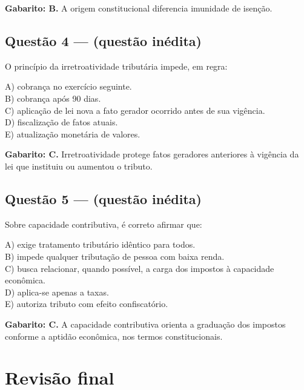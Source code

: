 \documentclass[11pt,a4paper]{article}
\begin{document}
\begin{alerta}
\textbf{Gabarito: B.} A origem constitucional diferencia imunidade de isenção.
\end{alerta}

\subsection*{Questão 4 — (questão inédita)}

O princípio da irretroatividade tributária impede, em regra:

A) cobrança no exercício seguinte. \\ B) cobrança após 90 dias. \\ C) aplicação de lei nova a fato gerador ocorrido antes de sua vigência. \\ D) fiscalização de fatos atuais. \\ E) atualização monetária de valores.

\begin{alerta}
\textbf{Gabarito: C.} Irretroatividade protege fatos geradores anteriores à vigência da lei que instituiu ou aumentou o tributo.
\end{alerta}

\subsection*{Questão 5 — (questão inédita)}

Sobre capacidade contributiva, é correto afirmar que:

A) exige tratamento tributário idêntico para todos. \\ B) impede qualquer tributação de pessoa com baixa renda. \\ C) busca relacionar, quando possível, a carga dos impostos à capacidade econômica. \\ D) aplica-se apenas a taxas. \\ E) autoriza tributo com efeito confiscatório.

\begin{alerta}
\textbf{Gabarito: C.} A capacidade contributiva orienta a graduação dos impostos conforme a aptidão econômica, nos termos constitucionais.
\end{alerta}

\section*{Revisão final}
\end{document}
